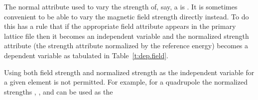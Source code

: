 The normal attribute used to vary the strength of, say, a
 is .  It is sometimes convenient to be able to
vary the magnetic field strength directly instead. To do this \bmad
has a rule that if the appropriate field attribute appears in the
primary lattice file then it becomes an independent variable and the
normalized strength attribute (the strength attribute normalized by
the reference energy) becomes a dependent variable as tabulated in
Table~\ref{t:dep.field}.
\begin{table}[ht]
\caption {Field and Strength Attributes.}
\label{t:dep.field}
\end{table}
Using both field strength and normalized strength as the independent
variable for a given element is not permitted. For example, for a quadrupole the 
normalized strengths , , and  can be used as the
